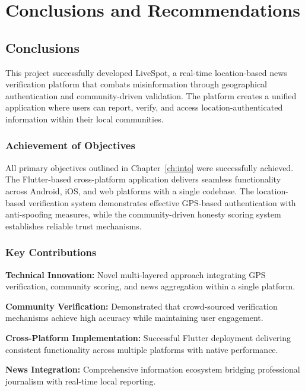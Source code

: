 \chapter{Conclusions and Recommendations}
\label{ch:conclusions}

\section{Conclusions}
\label{sec:conclusions}

This project successfully developed LiveSpot, a real-time location-based news verification platform that combats misinformation through geographical authentication and community-driven validation. The platform creates a unified application where users can report, verify, and access location-authenticated information within their local communities.

\subsection{Achievement of Objectives}
\label{subsec:achievement_objectives}

All primary objectives outlined in Chapter~\ref{ch:into} were successfully achieved. The Flutter-based cross-platform application delivers seamless functionality across Android, iOS, and web platforms with a single codebase. The location-based verification system demonstrates effective GPS-based authentication with anti-spoofing measures, while the community-driven honesty scoring system establishes reliable trust mechanisms.

\subsection{Key Contributions}
\label{subsec:key_contributions}

\textbf{Technical Innovation:} Novel multi-layered approach integrating GPS verification, community scoring, and news aggregation within a single platform.

\textbf{Community Verification:} Demonstrated that crowd-sourced verification mechanisms achieve high accuracy while maintaining user engagement.

\textbf{Cross-Platform Implementation:} Successful Flutter deployment delivering consistent functionality across multiple platforms with native performance.

\textbf{News Integration:} Comprehensive information ecosystem bridging professional journalism with real-time local reporting.

